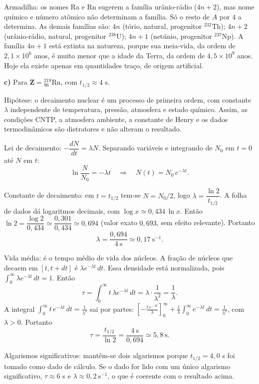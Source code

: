 \documentclass{article}%
\begin{document}
Armadilha: os nomes Ra e Rn sugerem a família urânio-rádio ($4n+2$), mas nome químico e número atômico não determinam a família. Só o resto de $A$ por $4$ a determina. As demais famílias são: $4n$ (tório, natural, progenitor ${}^{232}$Th); $4n+2$ (urânio-rádio, natural, progenitor ${}^{238}$U); $4n+1$ (netúnio, progenitor ${}^{237}$Np). A família $4n+1$ está extinta na natureza, porque sua meia-vida, da ordem de $2{,}1\times 10^{6}$ anos, é muito menor que a idade da Terra, da ordem de $4{,}5\times 10^{9}$ anos. Hoje ela existe apenas em quantidades traço, de origem artificial.

\textbf{c)} Para $\mathbf{Z}={}^{219}_{86}\mathrm{Rn}$, com $t_{1/2}\approx 4$ s.

Hipótese: o decaimento nuclear é um processo de primeira ordem, com constante $\lambda$ independente de temperatura, pressão, atmosfera e estado químico. Assim, as condições CNTP, a atmosfera ambiente, a constante de Henry e os dados termodinâmicos são distratores e não alteram o resultado.

Lei de decaimento: $-\dfrac{dN}{dt}=\lambda N$. Separando variáveis e integrando de $N_0$ em $t=0$ até $N$ em $t$:
\[
\ln\frac{N}{N_0}=-\lambda t\quad\Rightarrow\quad N(t)=N_0\,e^{-\lambda t}.
\]

Constante de decaimento: em $t=t_{1/2}$ tem-se $N=N_0/2$, logo $\lambda=\dfrac{\ln 2}{t_{1/2}}$. A folha de dados dá logaritmos decimais, com $\log x\simeq 0{,}434\,\ln x$. Então $\ln 2=\dfrac{\log 2}{0{,}434}\simeq\dfrac{0{,}301}{0{,}434}\simeq 0{,}694$ (valor exato $0{,}693$, sem efeito relevante). Portanto
\[
\lambda=\frac{0{,}694}{4\ \mathrm{s}}\simeq 0{,}17\ \mathrm{s}^{-1}.
\]

Vida média: é o tempo médio de vida dos núcleos. A fração de núcleos que decaem em $[t,t+dt]$ é $\lambda e^{-\lambda t}\,dt$. Essa densidade está normalizada, pois $\int_0^\infty \lambda e^{-\lambda t}\,dt=1$. Então
\[
\tau=\int_0^\infty t\,\lambda e^{-\lambda t}\,dt=\lambda\cdot\frac{1}{\lambda^2}=\frac{1}{\lambda}.
\]
A integral $\int_0^\infty t\,e^{-\lambda t}\,dt=\frac{1}{\lambda^2}$ sai por partes: $\left[-\frac{t\,e^{-\lambda t}}{\lambda}\right]_0^\infty+\frac{1}{\lambda}\int_0^\infty e^{-\lambda t}\,dt=\frac{1}{\lambda^2}$, com $\lambda>0$. Portanto
\[
\tau=\frac{t_{1/2}}{\ln 2}=\frac{4\ \mathrm{s}}{0{,}694}\simeq 5{,}8\ \mathrm{s}.
\]

Algarismos significativos: mantêm-se dois algarismos porque $t_{1/2}=4{,}0$ s foi tomado como dado de cálculo. Se o dado for lido com um único algarismo significativo, $\tau\approx 6$ s e $\lambda\approx 0{,}2\ \mathrm{s}^{-1}$, o que é coerente com o resultado acima.
\end{document}
